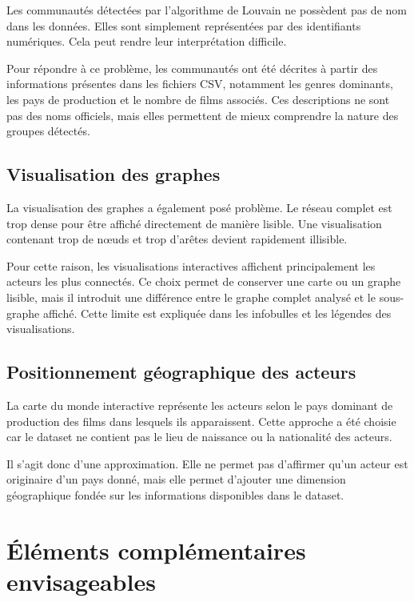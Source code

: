 \documentclass[11pt,a4paper,oneside,openany]{report}
\begin{document}
Les communautés détectées par l’algorithme de Louvain ne possèdent pas de nom dans les données. Elles sont simplement représentées par des identifiants numériques. Cela peut rendre leur interprétation difficile.

Pour répondre à ce problème, les communautés ont été décrites à partir des informations présentes dans les fichiers CSV, notamment les genres dominants, les pays de production et le nombre de films associés. Ces descriptions ne sont pas des noms officiels, mais elles permettent de mieux comprendre la nature des groupes détectés.

\section{Visualisation des graphes}

La visualisation des graphes a également posé problème. Le réseau complet est trop dense pour être affiché directement de manière lisible. Une visualisation contenant trop de nœuds et trop d’arêtes devient rapidement illisible.

Pour cette raison, les visualisations interactives affichent principalement les acteurs les plus connectés. Ce choix permet de conserver une carte ou un graphe lisible, mais il introduit une différence entre le graphe complet analysé et le sous-graphe affiché. Cette limite est expliquée dans les infobulles et les légendes des visualisations.

\section{Positionnement géographique des acteurs}

La carte du monde interactive représente les acteurs selon le pays dominant de production des films dans lesquels ils apparaissent. Cette approche a été choisie car le dataset ne contient pas le lieu de naissance ou la nationalité des acteurs.

Il s’agit donc d’une approximation. Elle ne permet pas d’affirmer qu’un acteur est originaire d’un pays donné, mais elle permet d’ajouter une dimension géographique fondée sur les informations disponibles dans le dataset.

\chapter{Éléments complémentaires envisageables}
\end{document}
